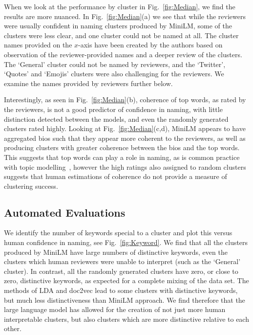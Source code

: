 \documentclass{article}
\begin{document}
When we look at the performance by cluster in Fig.~\ref{fig:Median}, we find the results are more nuanced.  In Fig.~\ref{fig:Median}(a) we see that while the reviewers were usually confident in naming clusters produced by  MiniLM, some of the clusters were less clear, and one cluster could not be named at all.  The cluster names provided on the $x$-axis have been created by the authors based on observation of the reviewer-provided names and a deeper review of the clusters.  The `General' cluster could not be named by reviewers, and the `Twitter', `Quotes' and `Emojis' clusters were also challenging for the reviewers.  We examine the names provided by reviewers further below.

Interestingly, as seen in Fig.~\ref{fig:Median}(b), coherence of top words, as rated by the reviewers, is not a good predictor of confidence in naming, with little distinction detected between the models, and even the randomly generated clusters rated highly.  Looking at Fig.~\ref{fig:Median}(c,d), MiniLM appears to have aggregated bios such that they appear more coherent to the reviewers, as well as producing clusters with greater coherence between the bios and the top words.  This suggests that top words can play a role in naming, as is common practice with topic modelling~\cite{doogan2021}, however the high ratings also assigned to random clusters suggests that human estimations of coherence do not provide a measure of clustering success.
\subsection{{Automated Evaluations}}
 We identify the number of keywords special to a cluster and plot this versus human confidence in naming, see Fig.~\ref{fig:Keyword}.  We find that all the clusters produced by MiniLM have large numbers of distinctive keywords, even the clusters which human reviewers were unable to interpret (such as the `General' cluster).  In contrast, all the randomly generated clusters have zero, or close to zero, distinctive keywords, as expected for a complete mixing of the data set.  The methods of LDA and doc2vec lead to some clusters with distinctive keywords, but much less distinctiveness than MiniLM approach.  We find therefore that the large language model has allowed for the creation of not just more human interpretable clusters, but also clusters which are more distinctive relative to each other.  
\end{document}
